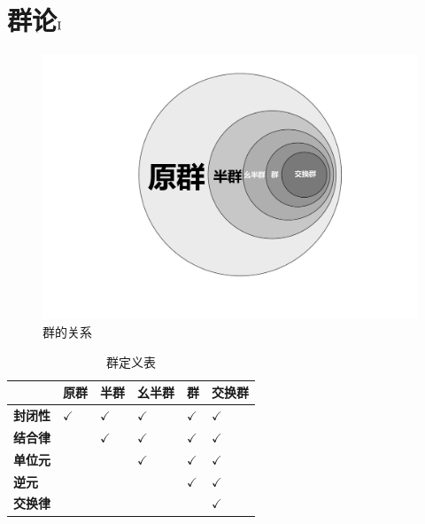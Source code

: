 % 

% 

\chapter{群论$\rm\Rmnum{1}$}

\begin{figure}[H]
	\centering
	\includegraphics[scale = 0.4]{../figure/群}
	\caption{群的关系}
\end{figure}

\begin{table}[H]
	\centering
	\caption{群定义表}
	\begin{tabular}{|>{\centering\arraybackslash}m{1.5cm}|>{\centering\arraybackslash}m{1.5cm}|>{\centering\arraybackslash}m{1.5cm}|>{\centering\arraybackslash}m{1.5cm}|>{\centering\arraybackslash}m{1.5cm}|>{\centering\arraybackslash}m{1.5cm}|}
		\hline
		& \textbf{原群} & \textbf{半群} & \textbf{幺半群} & \textbf{群} & \textbf{交换群} \\
		\hline
		\textbf{封闭性} & $\checkmark$ & $\checkmark$ & $\checkmark$ & $\checkmark$ & $\checkmark$ \\
		\hline
		\textbf{结合律} & & $\checkmark$ & $\checkmark$ & $\checkmark$ & $\checkmark$ \\
		\hline
		\textbf{单位元} & & & $\checkmark$ & $\checkmark$ & $\checkmark$ \\
		\hline
		\textbf{逆元} & & & & $\checkmark$ & $\checkmark$ \\
		\hline
		\textbf{交换律} & & & & & $\checkmark$ \\
		\hline
	\end{tabular}
\end{table}

